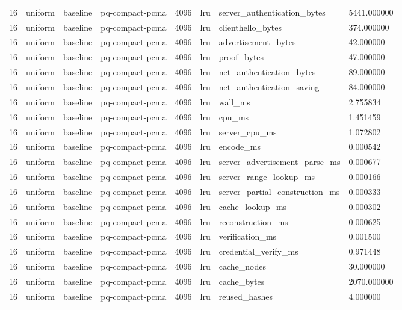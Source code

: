 \begin{tabular}{llllllll}
16 & uniform & baseline & pq-compact-pcma & 4096 & lru & server\_authentication\_bytes & 5441.000000 \\
16 & uniform & baseline & pq-compact-pcma & 4096 & lru & clienthello\_bytes & 374.000000 \\
16 & uniform & baseline & pq-compact-pcma & 4096 & lru & advertisement\_bytes & 42.000000 \\
16 & uniform & baseline & pq-compact-pcma & 4096 & lru & proof\_bytes & 47.000000 \\
16 & uniform & baseline & pq-compact-pcma & 4096 & lru & net\_authentication\_bytes & 89.000000 \\
16 & uniform & baseline & pq-compact-pcma & 4096 & lru & net\_authentication\_saving & 84.000000 \\
16 & uniform & baseline & pq-compact-pcma & 4096 & lru & wall\_ms & 2.755834 \\
16 & uniform & baseline & pq-compact-pcma & 4096 & lru & cpu\_ms & 1.451459 \\
16 & uniform & baseline & pq-compact-pcma & 4096 & lru & server\_cpu\_ms & 1.072802 \\
16 & uniform & baseline & pq-compact-pcma & 4096 & lru & encode\_ms & 0.000542 \\
16 & uniform & baseline & pq-compact-pcma & 4096 & lru & server\_advertisement\_parse\_ms & 0.000677 \\
16 & uniform & baseline & pq-compact-pcma & 4096 & lru & server\_range\_lookup\_ms & 0.000166 \\
16 & uniform & baseline & pq-compact-pcma & 4096 & lru & server\_partial\_construction\_ms & 0.000333 \\
16 & uniform & baseline & pq-compact-pcma & 4096 & lru & cache\_lookup\_ms & 0.000302 \\
16 & uniform & baseline & pq-compact-pcma & 4096 & lru & reconstruction\_ms & 0.000625 \\
16 & uniform & baseline & pq-compact-pcma & 4096 & lru & verification\_ms & 0.001500 \\
16 & uniform & baseline & pq-compact-pcma & 4096 & lru & credential\_verify\_ms & 0.971448 \\
16 & uniform & baseline & pq-compact-pcma & 4096 & lru & cache\_nodes & 30.000000 \\
16 & uniform & baseline & pq-compact-pcma & 4096 & lru & cache\_bytes & 2070.000000 \\
16 & uniform & baseline & pq-compact-pcma & 4096 & lru & reused\_hashes & 4.000000 \\

\end{tabular}
